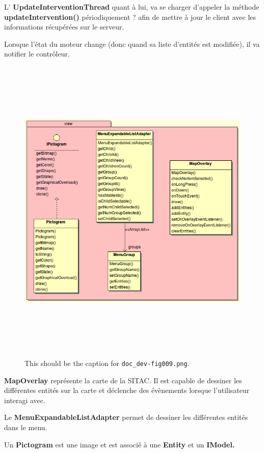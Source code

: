 \documentclass{article}
\begin{document}
L' \textbf{UpdateInterventionThread} quant à lui, va se charger d'appeler la méthode \textbf{updateIntervention()}
périodiquement ? afin de mettre à jour le client avec les informations récupérées 
sur le serveur.

Lorsque l'état du moteur change (donc quand sa liste d'entités est modifiée), il va notifier le contrôleur.

\begin{figure}[htbp]
\begin{center}
\includegraphics[width=499pt, height=427pt]{doc_dev-fig009.png}
\caption{This should be the caption for \texttt{doc\_dev-fig009.png}.}
\end{center}
\end{figure}


\textbf{MapOverlay} représente la carte de 
la SITAC. Il est capable de dessiner les différentes entités sur la carte et 
déclenche des évènements lorsque l'utilisateur interagi avec.

Le \textbf{MenuExpandableListAdapter} permet de dessiner les différentes entités dans le menu.

Un \textbf{Pictogram} est une image et est associé à une \textbf{Entity}
et un \textbf{IModel.}
\end{document}

